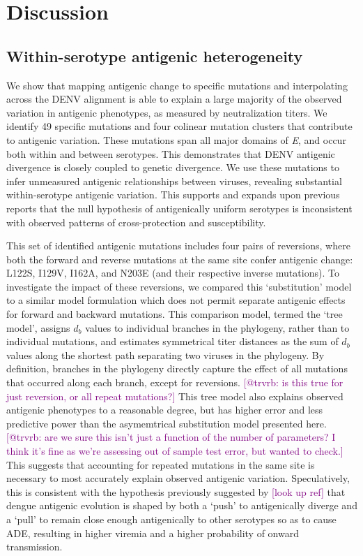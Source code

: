 \documentclass[11pt,oneside,letterpaper]{article}
\def\sbc#1{\textcolor{purple}{[#1]}}
\begin{document}
\pagebreak

\section*{Discussion}

\subsection*{Within-serotype antigenic heterogeneity}

We show that mapping antigenic change to specific mutations and interpolating across the DENV alignment is able to explain a large majority of the observed variation in antigenic phenotypes, as measured by neutralization titers.
We identify 49 specific mutations and four colinear mutation clusters that contribute to antigenic variation.
These mutations span all major domains of \textit{E}, and occur both within and between serotypes.
This demonstrates that DENV antigenic divergence is closely coupled to genetic divergence.
We use these mutations to infer unmeasured antigenic relationships between viruses, revealing substantial within-serotype antigenic variation.
This supports and expands upon previous reports \citep{katzelnick2015dengue} that the null hypothesis of antigenically uniform serotypes is inconsistent with observed patterns of cross-protection and susceptibility.

This set of identified antigenic mutations includes four pairs of reversions, where both the forward and reverse mutations at the same site confer antigenic change: L122S, I129V, I162A, and N203E (and their respective inverse mutations).
To investigate the impact of these reversions, we compared this `substitution' model to a similar model formulation which does not permit separate antigenic effects for forward and backward mutations.
This comparison model, termed the `tree model', assigns $d_b$ values to individual branches in the phylogeny, rather than to individual mutations, and estimates symmetrical titer distances as the sum of $d_b$ values along the shortest path separating two viruses in the phylogeny.
By definition, branches in the phylogeny directly capture the effect of all mutations that occurred along each branch, except for reversions.
\sbc{@trvrb: is this true for just reversion, or all repeat mutations?}
This tree model also explains observed antigenic phenotypes to a reasonable degree, but has higher error and less predictive power than the asymemtrical substitution model presented here.
\sbc{@trvrb: are we sure this isn't just a function of the number of parameters? I think it's fine as we're assessing out of sample test error, but wanted to check.}
This suggests that accounting for repeated mutations in the same site is necessary to most accurately explain observed antigenic variation.
Speculatively, this is consistent with the hypothesis previously suggested by \sbc{look up ref} that dengue antigenic evolution is shaped by both a `push' to antigenically diverge and a `pull' to remain close enough antigenically to other serotypes so as to cause ADE, resulting in higher viremia and a higher probability of onward transmission.
\end{document}
